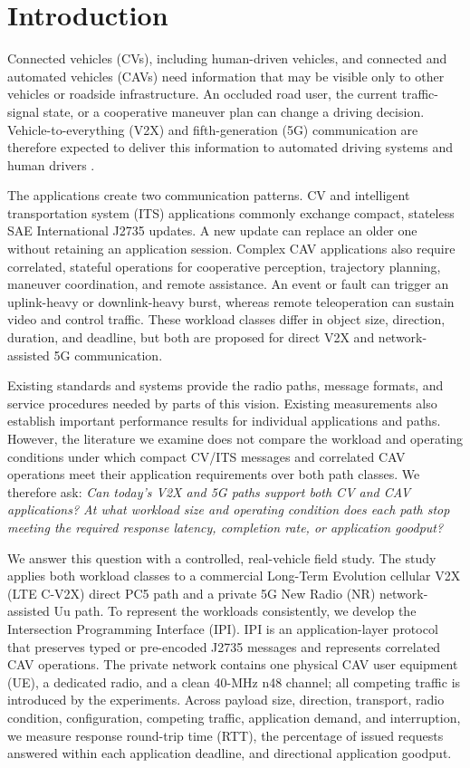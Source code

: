\section{Introduction}
\label{sec:introduction}

Connected vehicles (CVs), including human-driven vehicles, and connected and
automated vehicles (CAVs) need information that may be visible only to other
vehicles or roadside infrastructure. An occluded road user, the current
traffic-signal state, or a cooperative maneuver plan can change a driving
decision. Vehicle-to-everything (V2X) and fifth-generation (5G) communication
are therefore expected to deliver this information to automated driving
systems and human drivers
\cite{etsi122186r19,one6g2025overview}.

The applications create two communication patterns. CV and intelligent
transportation system (ITS) applications commonly exchange
compact, stateless SAE International J2735 updates. A new update can replace an
older one without retaining an application session. Complex CAV applications also require
correlated, stateful operations for cooperative perception, trajectory planning,
maneuver coordination, and remote assistance. An event or fault can trigger an
uplink-heavy or downlink-heavy burst, whereas remote teleoperation can sustain
video and control traffic. These workload classes differ in object size,
direction, duration, and deadline, but both are proposed for direct V2X and
network-assisted 5G communication.

Existing standards and systems provide the radio paths, message formats, and
service procedures needed by parts of this vision. Existing measurements also
establish important performance results for individual applications and paths.
However, the literature we examine does not compare the workload and operating
conditions under which compact CV/ITS messages and correlated CAV operations
meet their application requirements over both path classes. We therefore ask:
\emph{Can today's V2X and 5G paths support both CV and CAV applications? At
what workload size and operating condition does each path stop meeting the
required response latency, completion rate, or application goodput?}

We answer this question with a controlled, real-vehicle field study. The study
applies both workload classes to a commercial Long-Term Evolution cellular V2X
(LTE C-V2X) direct PC5 path and a private 5G New Radio (NR) network-assisted Uu
path. To represent the workloads consistently, we develop the Intersection
Programming Interface (IPI). IPI is an application-layer protocol that preserves
typed or pre-encoded J2735 messages and represents correlated CAV operations.
The private network contains one physical CAV user equipment (UE), a dedicated
radio, and a clean 40-MHz n48 channel; all competing traffic is introduced by
the experiments. Across payload size, direction, transport, radio condition,
configuration, competing traffic, application demand, and interruption, we
measure response round-trip time (RTT), the percentage of issued requests
answered within each application deadline, and directional application
goodput.

